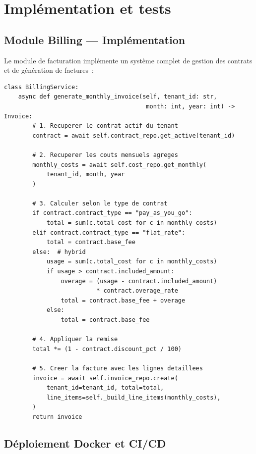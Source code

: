 \section{Implémentation et tests}
\label{sec:s3_realisation}

\subsection{Module Billing --- Implémentation}

Le module de facturation implémente un système complet de gestion des contrats et de génération de factures~:

\begin{lstlisting}[language=Python3, caption={Service de génération de factures (modules/billing/services/billing\_service.py)}]
class BillingService:
    async def generate_monthly_invoice(self, tenant_id: str,
                                        month: int, year: int) -> Invoice:
        # 1. Recuperer le contrat actif du tenant
        contract = await self.contract_repo.get_active(tenant_id)
        
        # 2. Recuperer les couts mensuels agreges
        monthly_costs = await self.cost_repo.get_monthly(
            tenant_id, month, year
        )
        
        # 3. Calculer selon le type de contrat
        if contract.contract_type == "pay_as_you_go":
            total = sum(c.total_cost for c in monthly_costs)
        elif contract.contract_type == "flat_rate":
            total = contract.base_fee
        else:  # hybrid
            usage = sum(c.total_cost for c in monthly_costs)
            if usage > contract.included_amount:
                overage = (usage - contract.included_amount) 
                          * contract.overage_rate
                total = contract.base_fee + overage
            else:
                total = contract.base_fee
        
        # 4. Appliquer la remise
        total *= (1 - contract.discount_pct / 100)
        
        # 5. Creer la facture avec les lignes detaillees
        invoice = await self.invoice_repo.create(
            tenant_id=tenant_id, total=total,
            line_items=self._build_line_items(monthly_costs),
        )
        return invoice
\end{lstlisting}


\subsection{Déploiement Docker et CI/CD}

